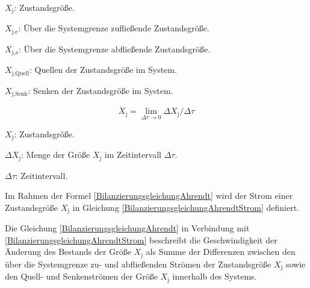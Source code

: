 \begin{description}
    \item \(X_{\text{j}}\): Zustandsgröße.
    \item \(X_{\text{j,e}}\): Über die Systemgrenze zufließende Zustandsgröße.
    \item \(X_{\text{j,a}}\): Über die Systemgrenze abfließende Zustandsgröße.
    \item \(X_{\text{j,Quell}}\): Quellen der Zustandsgröße im System.
    \item \(X_{\text{j,Senk}}\): Senken der Zustandsgröße im System.
\end{description}

\begin{equation}
    \dot{X}_{\text{j}} = \lim_{\Delta\tau \to 0} \Delta X_{\text{j}}/ \Delta\tau
    \label{BilanzierungsgleichungAhrendtStrom}
\end{equation}

\begin{description}
    \item \(X_{\text{j}}\): Zustandsgröße.
    \item \(\Delta X_{\text{j}}\): Menge der Größe \(X_{\text{j}}\) im Zeitintervall \(\Delta \tau\).
    \item \(\Delta \tau\): Zeitintervall.
\end{description}
Im Rahmen der Formel \eqref{BilanzierungsgleichungAhrendt} wird der Strom einer Zustandsgröße \(X_{\text{j}}\) in Gleichung 
\eqref{BilanzierungsgleichungAhrendtStrom} definiert.


Die Gleichung \eqref{BilanzierungsgleichungAhrendt} in Verbindung mit \eqref{BilanzierungsgleichungAhrendtStrom} beschreibt die Geschwindigkeit der Änderung des 
Bestands der Größe \(X_{\text{j}}\) als Summe der Differenzen zwischen den über die Systemgrenze zu- und abfließenden Strömen der Zustandsgröße 
\(X_{\text{j}}\) sowie den Quell- und Senkenströmen der Größe \(X_{\text{j}}\) innerhalb des Systems.

